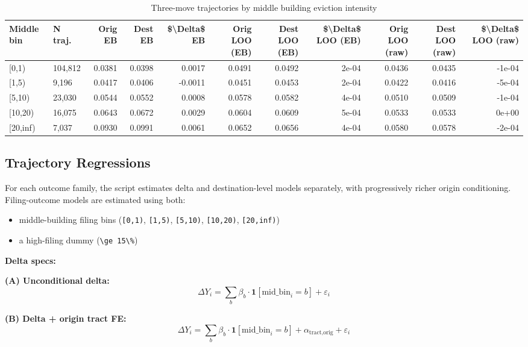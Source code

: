\documentclass[
  11pt,
]{article}
\providecommand{\tightlist}{%
  \setlength{\itemsep}{0pt}\setlength{\parskip}{0pt}}
\begin{document}
\begin{longtable}[t]{llrrrrrrrrr}
\caption{\label{tab:trajectory-table}Three-move trajectories by middle building eviction intensity}\\
\toprule
Middle bin & N traj. & Orig EB & Dest EB & \$\textbackslash{}Delta\$ EB & Orig LOO (EB) & Dest LOO (EB) & \$\textbackslash{}Delta\$ LOO (EB) & Orig LOO (raw) & Dest LOO (raw) & \$\textbackslash{}Delta\$ LOO (raw)\\
\midrule
{}[0,1) & 104,812 & 0.0381 & 0.0398 & 0.0017 & 0.0491 & 0.0492 & 2e-04 & 0.0436 & 0.0435 & -1e-04\\
{}[1,5) & 9,196 & 0.0417 & 0.0406 & -0.0011 & 0.0451 & 0.0453 & 2e-04 & 0.0422 & 0.0416 & -5e-04\\
{}[5,10) & 23,030 & 0.0544 & 0.0552 & 0.0008 & 0.0578 & 0.0582 & 4e-04 & 0.0510 & 0.0509 & -1e-04\\
{}[10,20) & 16,075 & 0.0643 & 0.0672 & 0.0029 & 0.0604 & 0.0609 & 5e-04 & 0.0533 & 0.0533 & 0e+00\\
{}[20,inf) & 7,037 & 0.0930 & 0.0991 & 0.0061 & 0.0652 & 0.0656 & 4e-04 & 0.0580 & 0.0578 & -2e-04\\
\bottomrule
\end{longtable}
\endgroup{}

\subsection{Trajectory Regressions}\label{trajectory-regressions}

For each outcome family, the script estimates delta and
destination-level models separately, with progressively richer origin
conditioning. Filing-outcome models are estimated using both:

\begin{itemize}
\tightlist
\item
  middle-building filing bins (\texttt{{[}0,1)}, \texttt{{[}1,5)},
  \texttt{{[}5,10)}, \texttt{{[}10,20)}, \texttt{{[}20,inf)})
\item
  a high-filing dummy
  (\texttt{\textbackslash{}ge\ 15\textbackslash{}\%})
\end{itemize}

\textbf{Delta specs:}

\textbf{(A) Unconditional delta:} \[
\Delta Y_i = \sum_{b} \beta_b \cdot \mathbf{1}[\text{mid\_bin}_i = b] + \varepsilon_i
\]

\textbf{(B) Delta + origin tract FE:} \[
\Delta Y_i = \sum_{b} \beta_b \cdot \mathbf{1}[\text{mid\_bin}_i = b] + \alpha_{\text{tract,orig}} + \varepsilon_i
\]
\end{document}
